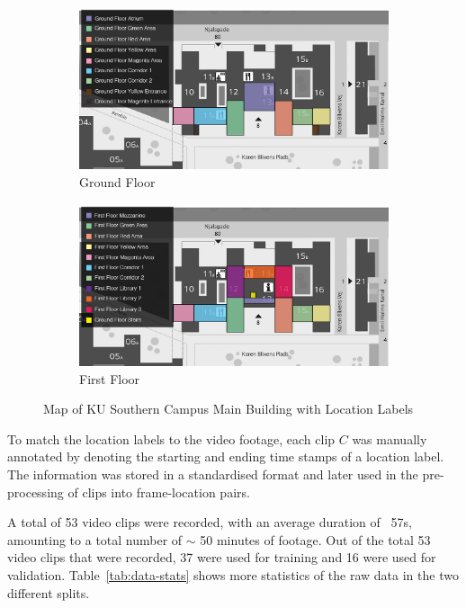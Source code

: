 \documentclass{article}
\begin{document}
  \begin{figure}[ht]
    \centering
    \begin{subfigure}[b]{0.49\linewidth}
      \centering
      \includegraphics[width=\linewidth]{figures/map-ground-floor.jpg}
      \caption{Ground Floor}
      \label{fig:map-ground-floor}
    \end{subfigure}
    \hfill
    \begin{subfigure}[b]{0.49\linewidth}
      \centering
      \includegraphics[width=\linewidth]{figures/map-first-floor.jpg}
      \caption{First Floor}
      \label{fig:map-first-floor}
    \end{subfigure}
    \caption{Map of KU Southern Campus Main Building with Location Labels}
    \label{fig:map}
  \end{figure}

  To match the location labels to the video footage, each clip $C$ was manually
  annotated by denoting the starting and ending time stamps of a location label.
  The information was stored in a standardised format and later used in the
  pre-processing of clips into frame-location pairs.

  A total of 53 video clips were recorded, with an average duration of ~57s,
  amounting to a total number of $\sim$ 50 minutes of footage. Out of the total
  53 video clips that were recorded, 37 were used for training and 16 were used
  for validation. Table~\ref{tab:data-stats} shows more statistics of the raw
  data in the two different splits.
\end{document}
